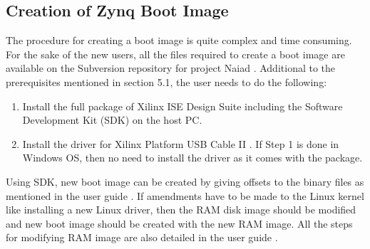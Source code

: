 \subsection{Creation of Zynq Boot Image}
The procedure for creating a boot image is quite complex and time consuming. For the sake of the new users, all the files required to create a boot image are available on the Subversion repository for project Naiad \cite{svnGimme}. Additional to the prerequisites mentioned in section 5.1, the user needs to do the following:\begin{enumerate}
\item Install the full package of Xilinx ISE Design Suite\cite{downloadISE} including the Software Development Kit (SDK) on the host PC.
\item Install the driver for Xilinx Platform USB Cable II \cite{driverCable}. If Step 1 is done in Windows OS, then no need to install the driver as it comes with the package.
\end{enumerate}

Using SDK, new boot image can be created by giving offsets to the binary files as mentioned in the user guide \cite{svnGimme}. If amendments have to be made to the Linux kernel like installing a new Linux driver, then the RAM disk image should be modified and new boot image should be created with the new RAM image. All the steps for modifying RAM image are also detailed in the user guide \cite{svnGimme}.
%
